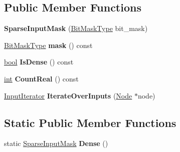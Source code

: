 \subsection*{Public Member Functions}
\begin{DoxyCompactItemize}
\item 
\mbox{\label{classv8_1_1internal_1_1compiler_1_1SparseInputMask_a42e47fc5388231e03003fb01d08721b1}} 
{\bfseries Sparse\+Input\+Mask} (\mbox{\hyperlink{classuint32__t}{Bit\+Mask\+Type}} bit\+\_\+mask)
\item 
\mbox{\label{classv8_1_1internal_1_1compiler_1_1SparseInputMask_a923a6c6731bc59225f73c70b139dbab5}} 
\mbox{\hyperlink{classuint32__t}{Bit\+Mask\+Type}} {\bfseries mask} () const
\item 
\mbox{\label{classv8_1_1internal_1_1compiler_1_1SparseInputMask_aacbe3d206e46dcb048d11f7db8736a34}} 
\mbox{\hyperlink{classbool}{bool}} {\bfseries Is\+Dense} () const
\item 
\mbox{\label{classv8_1_1internal_1_1compiler_1_1SparseInputMask_a60374f19f84f753f87571449b8041fd7}} 
\mbox{\hyperlink{classint}{int}} {\bfseries Count\+Real} () const
\item 
\mbox{\label{classv8_1_1internal_1_1compiler_1_1SparseInputMask_a06061c5df3575a7427b10d0d2b3a08ec}} 
\mbox{\hyperlink{classv8_1_1internal_1_1compiler_1_1SparseInputMask_1_1InputIterator}{Input\+Iterator}} {\bfseries Iterate\+Over\+Inputs} (\mbox{\hyperlink{classv8_1_1internal_1_1compiler_1_1Node}{Node}} $\ast$node)
\end{DoxyCompactItemize}
\subsection*{Static Public Member Functions}
\begin{DoxyCompactItemize}
\item 
\mbox{\label{classv8_1_1internal_1_1compiler_1_1SparseInputMask_ade2dfddc0cda5d43d4b1900cb3ca0cd1}} 
static \mbox{\hyperlink{classv8_1_1internal_1_1compiler_1_1SparseInputMask}{Sparse\+Input\+Mask}} {\bfseries Dense} ()
\end{DoxyCompactItemize}
